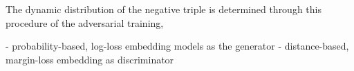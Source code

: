 The dynamic distribution of the negative triple is determined through this procedure of the adversarial training, 





\cite{cai2017kbgan}
- probability-based, log-loss embedding models as the generator
- distance-based, margin-loss embedding as discriminator
